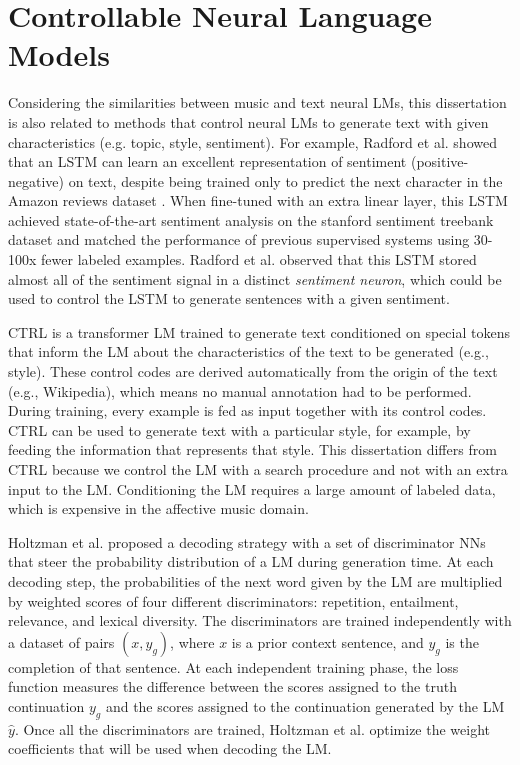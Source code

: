 
\section{Controllable Neural Language Models}
\label{sec:related_nlp}

Considering the similarities between music and text neural LMs, this dissertation is also related to methods that control neural LMs to generate text with given characteristics (e.g. topic, style, sentiment). For example, Radford et al. \cite{radford_2017} showed that an LSTM can learn an excellent representation of sentiment (positive-negative) on text, despite being trained only to predict the next character in the Amazon reviews dataset \cite{He2016}. When fine-tuned with an extra linear layer, this LSTM achieved state-of-the-art sentiment analysis on the stanford sentiment treebank dataset \cite{socher2013recursive} and matched the performance of previous supervised systems using 30-100x fewer labeled examples. Radford et al. \cite{radford_2017} observed that this LSTM stored almost all of the sentiment signal in a distinct \textit{sentiment neuron}, which could be used to control the LSTM to generate sentences with a given sentiment.

CTRL \cite{keskar2019ctrl} is a transformer LM trained to generate text conditioned on special tokens that inform the LM about the characteristics of the text to be generated (e.g., style). These control codes are derived automatically from the origin of the text (e.g., Wikipedia), which means no manual annotation had to be performed. During training, every example is fed as input together with its control codes. CTRL can be used to generate text with a particular style, for example, by feeding the information that represents that style. This dissertation differs from CTRL because we control the LM with a search procedure and not with an extra input to the LM. Conditioning the LM requires a large amount of labeled data, which is expensive in the affective music domain.

Holtzman et al. \cite{holtzman2018learning} proposed a decoding strategy with a set of discriminator NNs that steer the probability distribution of a LM during generation time. At each decoding step, the probabilities of the next word given by the LM are multiplied by weighted scores of four different discriminators: repetition, entailment, relevance, and lexical diversity. The discriminators are trained independently with a dataset of pairs $(x, y_g)$, where $x$ is a prior context sentence, and $y_g$ is the completion of that sentence. At each independent training phase, the loss function measures the difference between the scores assigned to the truth continuation $y_g$ and the scores assigned to the continuation generated by the LM $\hat{y}$. Once all the discriminators are trained, Holtzman et al. \cite{holtzman2018learning} optimize the weight coefficients that will be used when decoding the LM.

